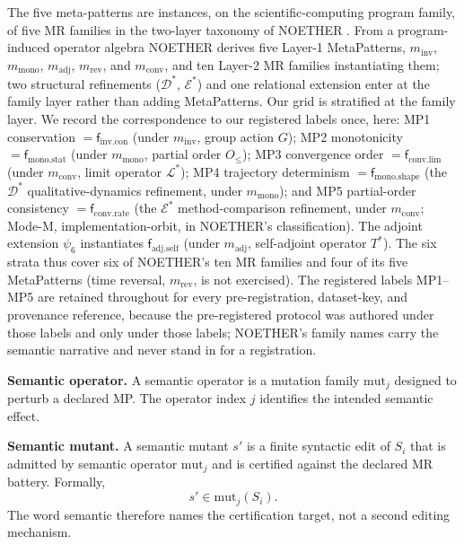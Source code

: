 \documentclass[manuscript,screen,review]{acmart}
\begin{document}
The five meta-patterns are instances, on the scientific-computing program
family, of five MR families in the two-layer taxonomy of NOETHER
\citep{noether2026}. From a program-induced operator algebra NOETHER derives
five Layer-1 MetaPatterns, \(m_{\mathrm{inv}}\), \(m_{\mathrm{mono}}\),
\(m_{\mathrm{adj}}\), \(m_{\mathrm{rev}}\), and \(m_{\mathrm{conv}}\), and ten
Layer-2 MR families instantiating them; two structural refinements
(\(\mathcal{D}^{*}\), \(\mathcal{E}^{*}\)) and one relational extension enter
at the family layer rather than adding MetaPatterns. Our grid is stratified at
the family layer. We record the correspondence to our registered labels once,
here: MP1 conservation \(= \mathsf{f}_{\mathrm{inv.con}}\) (under
\(m_{\mathrm{inv}}\), group action \(G\)); MP2 monotonicity
\(= \mathsf{f}_{\mathrm{mono.stat}}\) (under \(m_{\mathrm{mono}}\), partial
order \(O_{\le}\)); MP3 convergence order \(= \mathsf{f}_{\mathrm{conv.lim}}\)
(under \(m_{\mathrm{conv}}\), limit operator \(\mathcal{L}^{*}\)); MP4
trajectory determinism \(= \mathsf{f}_{\mathrm{mono.shape}}\) (the
\(\mathcal{D}^{*}\) qualitative-dynamics refinement, under
\(m_{\mathrm{mono}}\)); and MP5 partial-order consistency
\(= \mathsf{f}_{\mathrm{conv.rate}}\) (the \(\mathcal{E}^{*}\)
method-comparison refinement, under \(m_{\mathrm{conv}}\); Mode-M,
implementation-orbit, in NOETHER's classification). The adjoint extension
\(\psi_6\) instantiates \(\mathsf{f}_{\mathrm{adj.self}}\) (under
\(m_{\mathrm{adj}}\), self-adjoint operator \(T^{*}\)). The six strata thus
cover six of NOETHER's ten MR families and four of its five MetaPatterns
(time reversal, \(m_{\mathrm{rev}}\), is not exercised). The registered labels
MP1--MP5 are retained throughout for every pre-registration, dataset-key, and
provenance reference, because the pre-registered protocol was authored under
those labels and only under those labels; NOETHER's family names carry the
semantic narrative and never stand in for a registration.

\textbf{Semantic operator.} A semantic operator is a mutation family
\(\mathrm{mut}_j\) designed to perturb a declared MP. The operator index
\(j\) identifies the intended semantic effect.

\textbf{Semantic mutant.} A semantic mutant \(s'\) is a finite syntactic
edit of \(S_i\) that is admitted by semantic operator \(\mathrm{mut}_j\)
and is certified against the declared MR battery. Formally,
\[
  s' \in \mathrm{mut}_j(S_i).
\]
The word semantic therefore names the certification target, not a second
editing mechanism.
\end{document}
